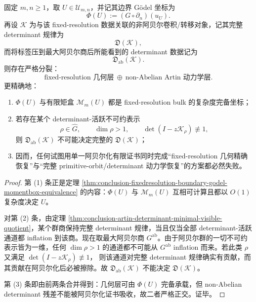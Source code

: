 \begin{theorem}\label{thm:conclusion-fixedresolution-geometry-artin-orthogonal-splitting}
固定 \(m,n\ge 1\)，取 \(U\in\mathcal U_{m,n}\)，并记其边界 Gödel 坐标为
\[
\Phi(U):=(G\circ \partial_n)(u_U).
\]
再设 \(\mathcal K\) 为与该 fixed-resolution 数据关联的非阿贝尔卷积/转移对象，记其完整 determinant 规律为
\[
\mathfrak D(\mathcal K),
\]
而将标签压到最大阿贝尔商后所能看到的 determinant 数据记为
\[
\mathfrak D_{\mathrm{ab}}(\mathcal K).
\]
则存在严格分裂：
\[
\text{fixed-resolution 几何层}
\ \oplus\
\text{non-Abelian Artin 动力学层}.
\]
更精确地：
\begin{enumerate}
  \item \(\Phi(U)\) 与有限矩盒 \(\mathcal M_m(U)\) 都是 fixed-resolution bulk 的复杂度完备坐标；
  \item 若存在某个 determinant-活跃不可约表示
        \[
        \rho\in\widehat G,
        \qquad
        \dim \rho>1,
        \qquad
        \det(I-z\mathcal K_\rho)\not\equiv 1,
        \]
        则 \(\mathfrak D_{\mathrm{ab}}(\mathcal K)\) 不可能决定完整的 \(\mathfrak D(\mathcal K)\)；
  \item 因而，任何试图用单一阿贝尔化有限证书同时完成“fixed-resolution 几何精确恢复”与“完整 primitive-orbit/determinant 动力学恢复”的方案都必然失败。
\end{enumerate}
\end{theorem}
\begin{proof}
第 (1) 条正是定理 \ref{thm:conclusion-fixedresolution-boundary-godel-momentbox-equivalence} 的内容：\(\Phi(U)\) 与 \(\mathcal M_m(U)\) 互相可计算且都以 \(O(1)\) 复杂度决定 \(U\)。

对第 (2) 条，由定理 \ref{thm:conclusion-artin-determinant-minimal-visible-quotient}，某个群商保持完整 determinant 规律，当且仅当全部 determinant-活跃通道都 inflation 到该商。现在取最大阿贝尔商 \(G^{\mathrm{ab}}\)。由于阿贝尔群的一切不可约表示皆为一维，任何
\(
\dim\rho>1
\)
的通道都不可能从 \(G^{\mathrm{ab}}\) inflation 而来。若此类 \(\rho\) 又满足
\(
\det(I-z\mathcal K_\rho)\not\equiv 1
\)，
则该通道对完整 determinant 规律确实有贡献，而其贡献在阿贝尔化后必被擦除。故 \(\mathfrak D_{\mathrm{ab}}(\mathcal K)\) 不能决定 \(\mathfrak D(\mathcal K)\)。

第 (3) 条即由前两条合并得到：几何层可由 \(\Phi(U)\) 完备承载，但 non-Abelian determinant 残差不能被阿贝尔化证书吸收，故二者严格正交。证毕。
\end{proof}

